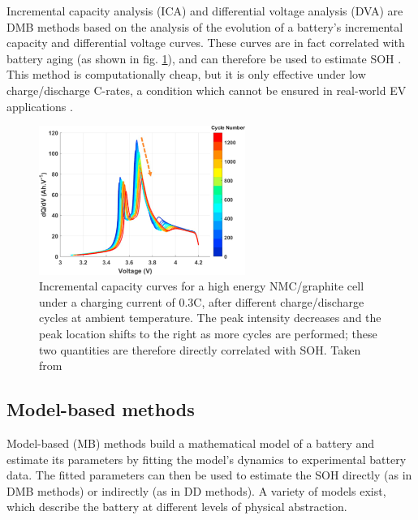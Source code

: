 Incremental capacity analysis (ICA) and differential voltage analysis (DVA) \cite{ica_dva1} are DMB methods based on the analysis of the evolution of a battery's incremental capacity and differential voltage curves. These curves are in fact correlated with battery aging (as shown in fig. \ref{fig:dva_img}), and can therefore be used to estimate SOH \cite{ica_dva2}. This method is computationally cheap, but it is only effective under low charge/discharge C-rates, a condition which cannot be ensured in real-world EV applications \cite{ica_dva3}.
\begin{figure}[hbt!]
    \centering
    \includegraphics[width=0.6\textwidth]{images/dva_img}
    \caption[Incremental capacity curves at different cycles]{Incremental capacity curves for a high energy NMC/graphite cell under a charging current of 0.3C, after different charge/discharge cycles at ambient temperature. The peak intensity decreases and the peak location shifts to the right as more cycles are performed; these two quantities are therefore directly correlated with SOH. Taken from \cite{dva_img}}
    \label{fig:dva_img}
\end{figure}

\subsection{Model-based methods}
\label{sec:mb_methods}
Model-based (MB) methods build a mathematical model of a battery and estimate its parameters by fitting the model's dynamics to experimental battery data. The fitted parameters can then be used to estimate the SOH directly (as in DMB methods) or indirectly (as in DD methods). A variety of models exist, which describe the battery at different levels of physical abstraction.

